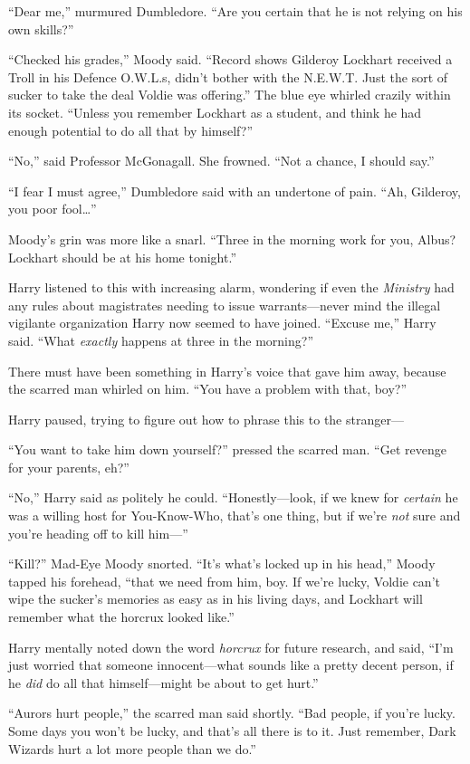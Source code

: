 “Dear me,” murmured Dumbledore. “Are you certain that he is not relying on his own skills?”

“Checked his grades,” Moody said. “Record shows Gilderoy Lockhart received a Troll in his Defence O.W.L.s, didn’t bother with the N.E.W.T. Just the sort of sucker to take the deal Voldie was offering.” The blue eye whirled crazily within its socket. “Unless you remember Lockhart as a student, and think he had enough potential to do all that by himself?”

“No,” said Professor McGonagall. She frowned. “Not a chance, I should say.”

“I fear I must agree,” Dumbledore said with an undertone of pain. “Ah, Gilderoy, you poor fool…”

Moody’s grin was more like a snarl. “Three in the morning work for you, Albus? Lockhart should be at his home tonight.”

Harry listened to this with increasing alarm, wondering if even the \emph{Ministry} had any rules about magistrates needing to issue warrants—never mind the illegal vigilante organization Harry now seemed to have joined. “Excuse me,” Harry said. “What \emph{exactly} happens at three in the morning?”

There must have been something in Harry’s voice that gave him away, because the scarred man whirled on him. “You have a problem with that, boy?”

Harry paused, trying to figure out how to phrase this to the stranger—

“You want to take him down yourself?” pressed the scarred man. “Get revenge for your parents, eh?”

“No,” Harry said as politely he could. “Honestly—look, if we knew for \emph{certain} he was a willing host for You-Know-Who, that’s one thing, but if we’re \emph{not} sure and you’re heading off to kill him—”

“Kill?” Mad-Eye Moody snorted. “It’s what’s locked up in his head,” Moody tapped his forehead, “that we need from him, boy. If we’re lucky, Voldie can’t wipe the sucker’s memories as easy as in his living days, and Lockhart will remember what the horcrux looked like.”

Harry mentally noted down the word \emph{horcrux} for future research, and said, “I’m just worried that someone innocent—what sounds like a pretty decent person, if he \emph{did} do all that himself—might be about to get hurt.”

“Aurors hurt people,” the scarred man said shortly. “Bad people, if you’re lucky. Some days you won’t be lucky, and that’s all there is to it. Just remember, Dark Wizards hurt a lot more people than we do.”

